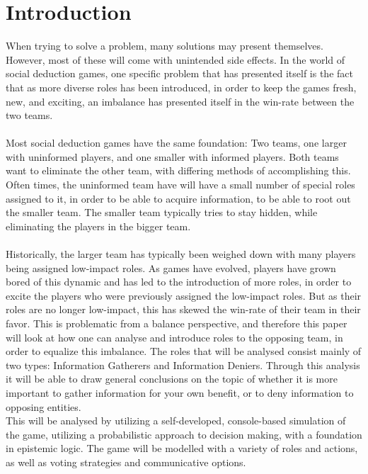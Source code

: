 \section{Introduction}
When trying to solve a problem, many solutions may present themselves. However,
most of these will come with unintended side effects. In the world of social
deduction games, one specific problem that has presented itself is the fact
that as more diverse roles has been introduced, in order to keep the games
fresh, new, and exciting, an imbalance has presented itself in the win-rate
between the two teams. \\ \\ Most social deduction games have the same
foundation: Two teams, one larger with uninformed players, and one smaller with
informed players. Both teams want to eliminate the other team, with differing
methods of accomplishing this. Often times, the uninformed team have will have
a small number of special roles assigned to it, in order to be able to acquire
information, to be able to root out the smaller team. The smaller team
typically tries to stay hidden, while eliminating the players in the bigger
team.\\ \\ Historically, the larger team has typically been weighed down with
many players being assigned low-impact roles. As games have evolved, players
have grown bored of this dynamic and has led to the introduction of more roles,
in order to excite the players who were previously assigned the low-impact
roles. But as their roles are no longer low-impact, this has skewed the
win-rate of their team in their favor. This is problematic from a balance
perspective, and therefore this paper will look at how one can analyse and
introduce roles to the opposing team, in order to equalize this imbalance. The
roles that will be analysed consist mainly of two types: Information Gatherers
and Information Deniers. Through this analysis it will be able to draw general
conclusions on the topic of whether it is more important to gather information
for your own benefit, or to deny information to opposing entities. \\

This will be analysed by utilizing a self-developed, console-based simulation
of the game, utilizing a probabilistic approach to decision making, with a
foundation in epistemic logic. The game will be modelled with a variety of
roles and actions, as well as voting strategies and communicative options.

